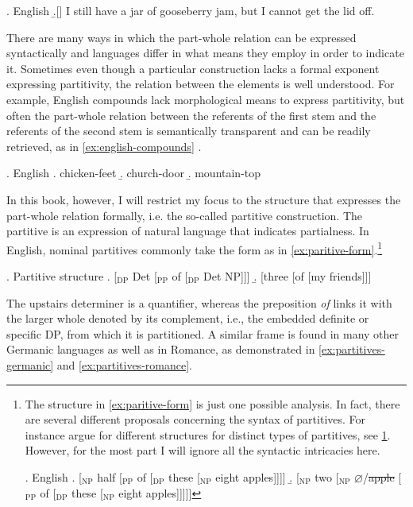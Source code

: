 \ex. English \citep[p. 1]{hoeksema1996introduction}
\b.[] I still have a jar of gooseberry jam, but I cannot get the lid off.\label{ex:partitivity-definites}

There are many ways in which the part-whole relation can be expressed syntactically and languages differ in what means they employ in order to indicate it. Sometimes even though a particular construction lacks a formal exponent expressing partitivity, the relation between the elements is well understood. For example, English compounds lack morphological means to express partitivity, but often the part-whole relation between the referents of the first stem and the referents of the second stem is semantically transparent and can be readily retrieved, as in \ref{ex:english-compounds} \citep{hoeksema1996introduction}.

\ex. English \citep[p. 1]{hoeksema1996introduction}\label{ex:english-compounds}
\a. chicken-feet
\b. church-door
\b. mountain-top

In this book, however, I will restrict my focus to the structure that expresses the part-whole relation formally, i.e. the so-called partitive construction. The partitive is an expression of natural language that indicates partialness. In English, nominal partitives commonly take the form as in \ref{ex:paritive-form}.\footnote{The structure in \ref{ex:paritive-form} is just one possible analysis. In fact, there are several different proposals concerning the syntax of partitives. For instance \citet{ionin_matushansky_ruys2006parts} argue for different structures for distinct types of partitives, see \ref{ex:different-partitives-ionin-et-al}. However, for the most part I will ignore all the syntactic intricacies here.

\ex. English \citep{ionin_matushansky_ruys2006parts}\label{ex:different-partitives-ionin-et-al}
\a. [$_{\text{NP}}$ half [$_{\text{PP}}$ of [$_{\text{DP}}$ these [$_{\text{NP}}$ eight apples]]]]\label{ex:proportional-partitives-ionin-et-al}
\b. [$_{\text{NP}}$ two [$_{\text{NP}}$ $\varnothing$/\sout{apple} [$_{\text{PP}}$ of [$_{\text{DP}}$ these [$_{\text{NP}}$ eight apples]]]]]\label{ex:count-partitives-ionin-et-al}

}

\ex. Partitive structure \citep{marti_i_girbau2010syntax}\label{ex:paritive-form}
\a. [$_{\text{DP}}$ Det [$_{\text{PP}}$ of [$_{\text{DP}}$ Det NP]]]
\b. [three [of [my friends]]] 

The upstairs determiner is a quantifier, whereas the preposition \textit{of} links it with the larger whole denoted by its complement, i.e., the embedded definite or specific DP, from which it is partitioned. A similar frame is found in many other Germanic languages as well as in Romance, as demonstrated in \ref{ex:partitives-germanic} and \ref{ex:partitives-romance}.

